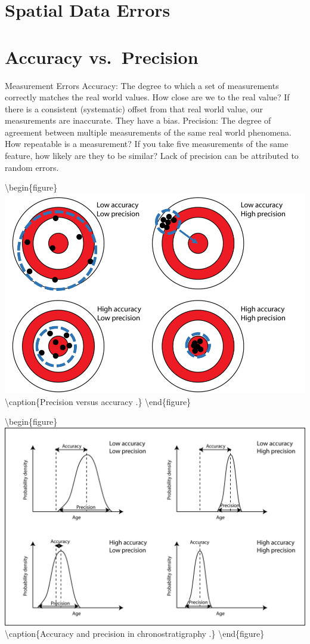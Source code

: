 \documentclass[
]{book}
\begin{document}
\hypertarget{spatial-data-errors}{%
\section{Spatial Data Errors}\label{spatial-data-errors}}

\hypertarget{accuracy-vs.-precision}{%
\section{Accuracy vs.~Precision}\label{accuracy-vs.-precision}}

Measurement Errors
Accuracy:
The degree to which a set of measurements correctly matches the real world values. How close are we to the real value?
If there is a consistent (systematic) offset from that real world value, our measurements are inaccurate. They have a bias.
Precision:
The degree of agreement between multiple measurements of the same real world phenomena. How repeatable is a measurement?
If you take five measurements of the same feature, how likely are they to be similar? Lack of precision can be attributed to random errors.

\textbackslash begin\{figure\}
\includegraphics[width=0.9\linewidth]{images/16-accuracy-vs-precision} \textbackslash caption\{Precision versus accuracy \citep{davies_precision_2020}.\}\label{fig:16-accuracy-vs-precision}
\textbackslash end\{figure\}

\textbackslash begin\{figure\}
\includegraphics[width=1\linewidth]{images/16-accuracy-vs-precision2} \textbackslash caption\{Accuracy and precision in chronostratigraphy \citep{davies_accuracy_2020}.\}\label{fig:16-accuracy-vs-precision2}
\textbackslash end\{figure\}
\end{document}
